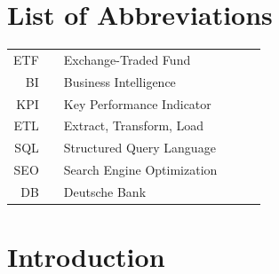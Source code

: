 \documentclass[11pt,a4paper]{article}
\begin{document}
\setcounter{page}{2}
\onehalfspacing
\setcounter{tocdepth}{4}
\parindent=0in
\parskip=8pt  %
\setlength{\belowcaptionskip}{-10pt}


\newpage
\tableofcontents

\newpage

\pagebreak
\listoffigures
\listoftables

\newpage
\section*{List of Abbreviations}

\begin{tabular}{rp{0.2cm}lp{1cm}p{7cm}l}
    ETF     & &  \small Exchange-Traded Fund   & &      \\
    BI     & &  \small Business Intelligence   & & \\
    KPI     & &  \small Key Performance Indicator   & & \\
    ETL     & &  \small Extract, Transform, Load   & & \\
    SQL     & &  \small Structured Query Language  & & \\
    SEO     & &  \small Search Engine Optimization  & & \\
        DB     & &  \small Deutsche Bank  & & \\
\end{tabular}

\captionsetup{justification=justified,singlelinecheck=false}

\pagebreak
{}
\flushbottom
\doublespacing
\parindent=1cm



\section{Introduction}
\label{intro}
\end{document}
